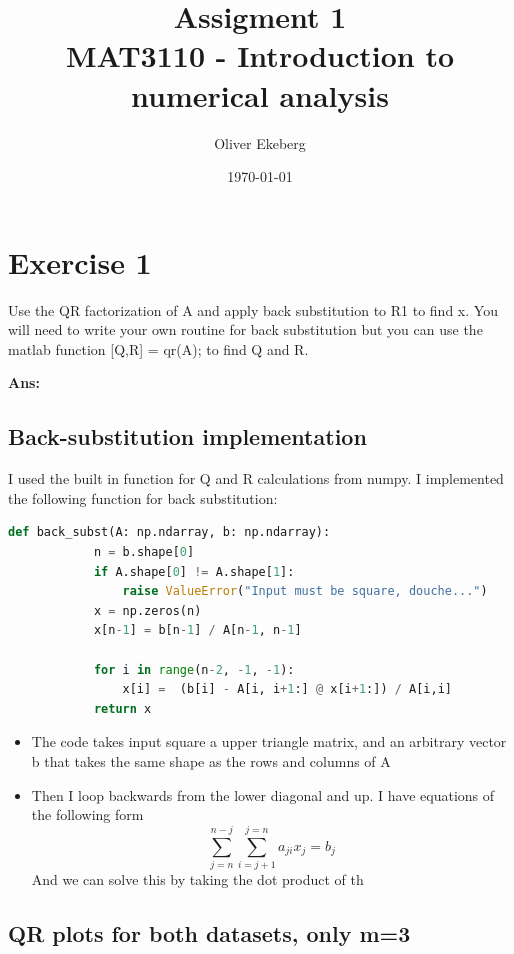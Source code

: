 \documentclass[11pt]{article}
\title{Assigment 1 \\ MAT3110 - Introduction to numerical analysis}
\author{Oliver Ekeberg}
\date{\today}
\newenvironment{solbox}
  {\begin{mdframed}[linewidth=1pt,linecolor=black,roundcorner=5pt]
   \noindent\textbf{Ans: }\enspace}
  {\end{mdframed}}
\begin{document}
\maketitle


\tableofcontents

\section{Exercise 1}

Use the QR factorization of A and apply back substitution to R1 to
find x. You will need to write your own routine for back substitution
but you can use the matlab function
[Q,R] = qr(A);
to find Q and R.


\begin{solbox}

    \subsection{Back-substitution implementation}
    

    I used the built in function for Q and R calculations from numpy. I implemented the following function for back substitution:

    \begin{lstlisting}[language=Python]
        def back_subst(A: np.ndarray, b: np.ndarray):
            n = b.shape[0]
            if A.shape[0] != A.shape[1]:
                raise ValueError("Input must be square, douche...")
            x = np.zeros(n)
            x[n-1] = b[n-1] / A[n-1, n-1]

            for i in range(n-2, -1, -1):
                x[i] =  (b[i] - A[i, i+1:] @ x[i+1:]) / A[i,i]
            return x
    \end{lstlisting}
    \begin{itemize}
        \item The code takes input square a upper triangle matrix, and an arbitrary vector b that takes the same shape as the rows and columns of A
        \item Then I loop backwards from the lower diagonal and up. I have equations of the following form
        \[
            \sum_{ j=n }^{ n-j } \sum_{ i=j+1 }^{ j=n } a_{ji} x_j = b_j 
        \]
        And we can solve this by taking the dot product of th
        
    
    \end{itemize}
    

    \subsection{QR plots for both datasets, only m=3}
    

\end{solbox}
\end{document}
